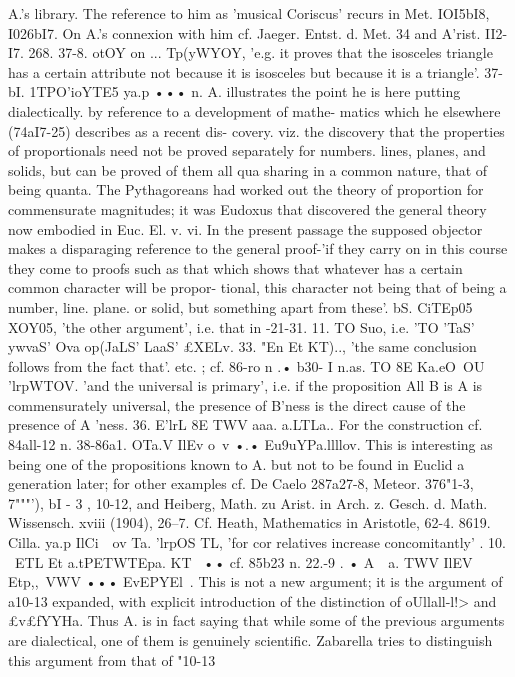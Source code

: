{{{{{{{{{{{{{{{{{{{{{{{{{{{{{{{{{A.'s library. The reference to him as 'musical Coriscus' recurs in
Met. IOI5bI8, I026bI7. On A.'s connexion with him cf. Jaeger.
Entst. d. Met. 34 and A'rist. II2-I7. 268.
37-8. otOY on ... Tp(yWYOY, 'e.g. it proves that the isosceles
triangle has a certain attribute not because it is isosceles but
because it is a triangle'.
37-bI. 1TPO'ioYTE5 ya.p ••• n. A. illustrates the point he is here
putting dialectically. by reference to a development of mathe-
matics which he elsewhere (74aI7-25) describes as a recent dis-
covery. viz. the discovery that the properties of proportionals
need not be proved separately for numbers. lines, planes, and
solids, but can be proved of them all qua sharing in a common
nature, that of being quanta. The Pythagoreans had worked out
the theory of proportion for commensurate magnitudes; it was
Eudoxus that discovered the general theory now embodied in
Euc. El. v. vi. In the present passage the supposed objector
makes a disparaging reference to the general proof-'if they carry
on in this course they come to proofs such as that which shows
that whatever has a certain common character will be propor-
tional, this character not being that of being a number, line.
plane. or solid, but something apart from these'.
bS. CiTEp05 XOY05, 'the other argument', i.e. that in -21-31.
11. TO Suo, i.e. 'TO 'TaS' ywv{aS' Ova op(JaLS' LaaS' £XELv.
33. "En Et KT).., 'the same conclusion follows from the fact
that'. etc. ; cf. 86-ro n .• b30- I n.as. TO 8E Ka.eO~OU 'lrpWTOV. 'and the universal is primary', i.e.
if the proposition All B is A is commensurately universal, the
presence of B'ness is the direct cause of the presence of A 'ness.
36. E'lrL 8E TWV aaa. a.LTLa.. For the construction cf. 84all-12 n.
38-86a1. OTa.V IlEv o~v •.• Eu9uYPa.llllov. This is interesting
as being one of the propositions known to A. but not to be found
in Euclid a generation later; for other examples cf. De Caelo
287a27-8, Meteor. 376"1-3, 7"""'), bI - 3 , 10-12, and Heiberg, Math.
zu Arist. in Arch. z. Gesch. d. Math. Wissensch. xviii (1904), 26--7.
Cf. Heath, Mathematics in Aristotle, 62-4.
8619. Cilla. ya.p IlCi~~ov Ta. 'lrpOS TL, 'for cor relatives increase
concomitantly' .
10. ~ETL Et a.tPETWTEpa. KT~ •• cf. 85b23 n.
22.-9 . • A~~a. TWV IlEV Etp,,~VWV ••• EvEPYEl~. This is not a new
argument; it is the argument of a10-13 expanded, with explicit
introduction of the distinction of oUllall-l!> and £v£fYYHa. Thus A.
is in fact saying that while some of the previous arguments are
dialectical, one of them is genuinely scientific.
Zabarella tries to distinguish this argument from that of "10-13
}}}}}}}}}}}}}}}}}}}}}}}}}}}}}}}}}}

